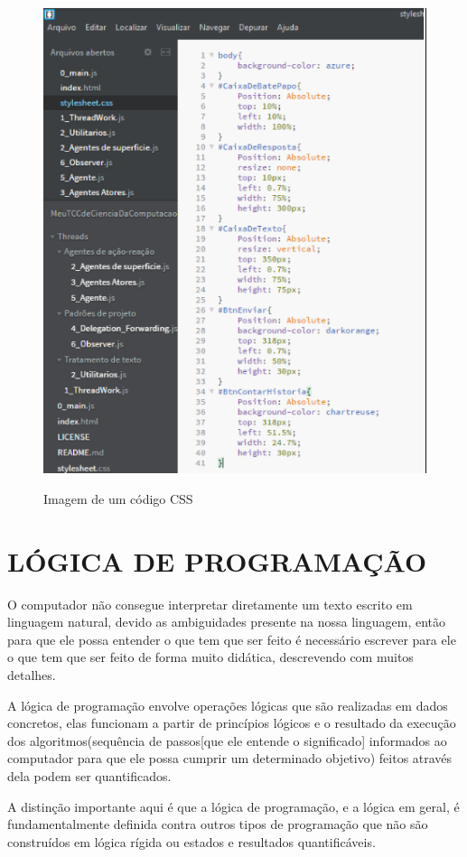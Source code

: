 \begin{figure}[H]
	\centering
	\caption{Imagem de um código CSS}
	\centering
	\includegraphics{./images/Figure_6}	
	\label{fig:Fig6} 
\end{figure}

\section{LÓGICA DE PROGRAMAÇÃO }
\label{sec:LÓGICA DE PROGRAMAÇÃO}

O computador não consegue interpretar diretamente um texto escrito em linguagem natural, devido as ambiguidades presente na nossa linguagem, então para que ele possa entender o que tem que ser feito é necessário escrever para ele o que tem que ser feito de forma muito didática, descrevendo com muitos detalhes.   

A lógica de programação envolve operações lógicas que são realizadas em dados concretos, elas funcionam a partir de princípios lógicos e o resultado da execução dos algoritmos(sequência de passos[que ele entende o significado] informados ao computador para que ele possa cumprir um determinado objetivo) feitos através dela podem ser quantificados. 

A distinção importante aqui é que a lógica de programação, e a lógica em geral, é fundamentalmente definida contra outros tipos de programação que não são construídos em lógica rígida ou estados e resultados quantificáveis. 

